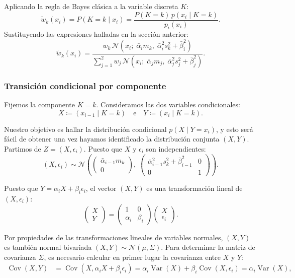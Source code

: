 \documentclass[11pt,a4paper]{article}
\DeclareMathOperator{\Var}{Var}
\DeclareMathOperator{\Cov}{Cov}
\begin{document}
Aplicando la regla de Bayes clásica a la variable discreta $K$:
\[
\tilde{w}_k(x_i) = P(K = k \mid x_i) = \frac{P(K = k)\,p(x_i \mid K = k)}{p_i(x_i)}.
\]
Sustituyendo las expresiones halladas en la sección anterior:
\[
\tilde{w}_k(x_i) = \frac{w_k \, \mathcal{N}\left(x_i;\; \bar{\alpha}_i m_k,\; \bar{\alpha}_i^2 s_k^2 + \bar{\beta}_i^2\right)}{\sum\limits_{j=1}^2 w_j \, \mathcal{N}\left(x_i;\; \bar{\alpha}_j m_j,\; \bar{\alpha}_j^2 s_j^2 + \bar{\beta}_j^2\right)}.
\]

\subsubsection{Transición condicional por componente}

Fijemos la componente $K = k$. Consideramos las dos variables condicionales:
\[
X \coloneqq (x_{i-1} \mid K = k) \quad \text{e} \quad Y \coloneqq (x_i \mid K = k).
\]

Nuestro objetivo es hallar la distribución condicional $p(X \mid Y = x_i)$, y esto será fácil de obtener una vez hayamos identificado la distribución conjunta $(X, Y)$. Partimos de $Z=(X, \epsilon_i)$. Puesto que $X$ y $\epsilon_i$ son independientes:
\begin{equation*}
  (X, \epsilon_i) \sim \mathcal{N}\left(\begin{pmatrix} \bar{\alpha}_{i-1} m_k \\ 0 \end{pmatrix},\; \begin{pmatrix} \bar{\alpha}_{i-1}^2 s_k^2 + \bar{\beta}_{i-1}^2 & 0 \\ 0 & 1 \end{pmatrix}\right).
\end{equation*}

Puesto que $Y = \alpha_i X + \beta_i \epsilon_i$, el vector $(X, Y)$ es una transformación lineal de $(X, \epsilon_i)$:
\[
\begin{pmatrix} X \\ Y \end{pmatrix} = \begin{pmatrix} 1 & 0 \\ \alpha_i & \beta_i \end{pmatrix} \begin{pmatrix} X \\ \epsilon_i \end{pmatrix}.
\]

Por propiedades de las transformaciones lineales de variables normales, $(X, Y)$ es también normal bivariada $(X,Y)\sim \mathcal{N}(\mu, \Sigma)$. Para determinar la matriz de covarianza $\Sigma$, es necesario calcular en primer lugar la covarianza entre $X$ y $Y$:
\begin{align*}
  \Cov(X, Y) &= \Cov(X, \alpha_i X + \beta_i \epsilon_i) = \alpha_i \Var(X) + \beta_i \Cov(X, \epsilon_i) = \alpha_i \Var(X),
\end{align*}
\end{document}
